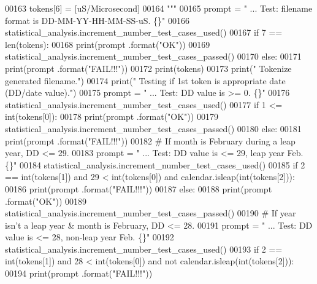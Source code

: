 \begin{DoxyCode}
00163 \textcolor{stringliteral}{            tokens[6] = [uS/Microsecond]}
00164 \textcolor{stringliteral}{        """}
00165         prompt = \textcolor{stringliteral}{"  ... Test: filename format is DD-MM-YY-HH-MM-SS-uS.  \{\}"}
00166         statistical\_analysis.increment\_number\_test\_cases\_used()
00167         \textcolor{keywordflow}{if} 7 == len(tokens):
00168             print(prompt .format(\textcolor{stringliteral}{"OK"}))
00169             statistical\_analysis.increment\_number\_test\_cases\_passed()
00170         \textcolor{keywordflow}{else}:
00171             print(prompt .format(\textcolor{stringliteral}{"FAIL!!!"}))
00172             print(tokens)
00173         print(\textcolor{stringliteral}{" Tokenize generated filename."})
00174         print(\textcolor{stringliteral}{" Testing if 1st token is appropriate date (DD/date value)."})
00175         prompt = \textcolor{stringliteral}{"  ... Test: DD value is >= 0.             \{\}"}
00176         statistical\_analysis.increment\_number\_test\_cases\_used()
00177         \textcolor{keywordflow}{if} 1 <= int(tokens[0]):
00178             print(prompt .format(\textcolor{stringliteral}{"OK"}))
00179             statistical\_analysis.increment\_number\_test\_cases\_passed()
00180         \textcolor{keywordflow}{else}:
00181             print(prompt .format(\textcolor{stringliteral}{"FAIL!!!"}))
00182         \textcolor{comment}{# If month is February during a leap year, DD <= 29.}
00183         prompt = \textcolor{stringliteral}{"  ... Test: DD value is <= 29, leap year Feb.     \{\}"}
00184         statistical\_analysis.increment\_number\_test\_cases\_used()
00185         \textcolor{keywordflow}{if} 2 == int(tokens[1]) \textcolor{keywordflow}{and} 29 < int(tokens[0]) \textcolor{keywordflow}{and} calendar.isleap(int(tokens[2])):
00186             print(prompt .format(\textcolor{stringliteral}{"FAIL!!!"}))
00187         \textcolor{keywordflow}{else}:
00188             print(prompt .format(\textcolor{stringliteral}{"OK"}))
00189             statistical\_analysis.increment\_number\_test\_cases\_passed()
00190         \textcolor{comment}{# If year isn't a leap year & month is February, DD <= 28.}
00191         prompt = \textcolor{stringliteral}{"  ... Test: DD value is <= 28, non-leap year Feb.     \{\}"}
00192         statistical\_analysis.increment\_number\_test\_cases\_used()
00193         \textcolor{keywordflow}{if} 2 == int(tokens[1]) \textcolor{keywordflow}{and} 28 < int(tokens[0]) \textcolor{keywordflow}{and} \textcolor{keywordflow}{not} calendar.isleap(int(tokens[2])):
00194             print(prompt .format(\textcolor{stringliteral}{"FAIL!!!"}))

\end{DoxyCode}
